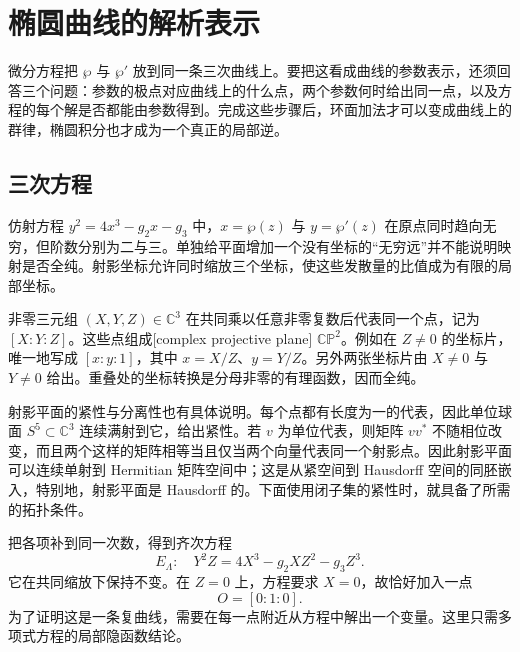 \section{椭圆曲线的解析表示}
\label{b3:sec:2204}

微分方程把 \(\wp\) 与 \(\wp'\) 放到同一条三次曲线上。要把这看成曲线的参数表示，还须回答三个问题：参数的极点对应曲线上的什么点，两个参数何时给出同一点，以及方程的每个解是否都能由参数得到。完成这些步骤后，环面加法才可以变成曲线上的群律，椭圆积分也才成为一个真正的局部逆。

\subsection{三次方程}
\label{b3:subsec:220401}

仿射方程 \(y^2=4x^3-g_2x-g_3\) 中，\(x=\wp(z)\) 与 \(y=\wp'(z)\) 在原点同时趋向无穷，但阶数分别为二与三。单独给平面增加一个没有坐标的“无穷远”并不能说明映射是否全纯。射影坐标允许同时缩放三个坐标，使这些发散量的比值成为有限的局部坐标。

\ProseParagraphBreak

非零三元组 \((X,Y,Z)\in\mathbb C^3\) 在共同乘以任意非零复数后代表同一个点，记为 \([X:Y:Z]\)。这些点组成[complex projective plane] \(\mathbb{CP}^2\)。例如在 \(Z\ne0\) 的坐标片，唯一地写成 \([x:y:1]\)，其中 \(x=X/Z\)、\(y=Y/Z\)。另外两张坐标片由 \(X\ne0\) 与 \(Y\ne0\) 给出。重叠处的坐标转换是分母非零的有理函数，因而全纯。

\ProseParagraphBreak

射影平面的紧性与分离性也有具体说明。每个点都有长度为一的代表，因此单位球面 \(S^5\subset\mathbb C^3\) 连续满射到它，给出紧性。若 \(v\) 为单位代表，则矩阵 \(vv^*\) 不随相位改变，而且两个这样的矩阵相等当且仅当两个向量代表同一个射影点。因此射影平面可以连续单射到 Hermitian 矩阵空间中；这是从紧空间到 Hausdorff 空间的同胚嵌入，特别地，射影平面是 Hausdorff 的。下面使用闭子集的紧性时，就具备了所需的拓扑条件。

\ProseParagraphBreak

把各项补到同一次数，得到齐次方程
\begin{equation}\label{b3:eq:22-projective-cubic}
 E_\Lambda:\quad Y^2Z=4X^3-g_2XZ^2-g_3Z^3.
\end{equation}
它在共同缩放下保持不变。在 \(Z=0\) 上，方程要求 \(X=0\)，故恰好加入一点
\[
 O=[0:1:0].
\]
为了证明这是一条复曲线，需要在每一点附近从方程中解出一个变量。这里只需多项式方程的局部隐函数结论。

